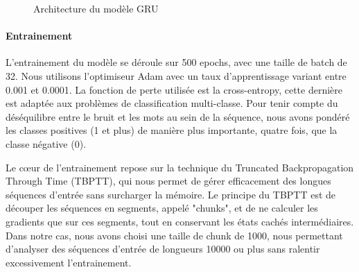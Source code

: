 \documentclass{article}
\begin{document}
\begin{figure}[ht]
    \centering
    \caption{Architecture du modèle GRU}
\end{figure}


\paragraph{Entrainement} L'entrainement du modèle se déroule sur 500 epochs, avec une taille de batch de 32. Nous utilisons l'optimiseur Adam avec un 
taux d'apprentissage variant entre 0.001 et 0.0001. La fonction de perte utilisée est la cross-entropy, cette dernière est adaptée aux problèmes de classification multi-classe.
Pour tenir compte du déséquilibre entre le bruit et les mots au sein de la séquence, nous avons pondéré les classes positives (1 et plus) de manière plus importante, quatre fois, que 
la classe négative (0).
\par Le cœur de l'entrainement repose sur la technique du Truncated Backpropagation Through Time (TBPTT), qui nous permet de gérer efficacement des longues séquences d'entrée sans 
surcharger la mémoire. Le principe du TBPTT est de découper les séquences en segments, appelé "chunks", et de ne calculer les gradients que sur ces segments, tout en conservant les 
états cachés intermédiaires. Dans notre cas, nous avons choisi une taille de chunk de 1000, nous permettant d'analyser des séquences d'entrée de longueurs 10000 ou plus sans ralentir
excessivement l'entrainement.
\end{document}

